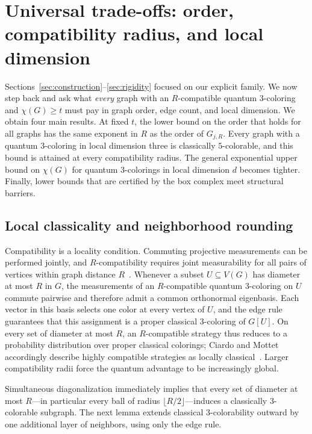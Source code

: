 \section{Universal trade-offs: order, compatibility radius, and local dimension}\label{sec:universal}

Sections~\ref{sec:construction}--\ref{sec:rigidity} focused on our explicit family. We now step back and ask what \emph{every} graph with an $R$-compatible quantum $3$-coloring and $\chi(G)\ge t$ must pay in graph order, edge count, and local dimension. We obtain four main results. At fixed $t$, the lower bound on the order that holds for all graphs has the same exponent in $R$ as the order of $G_{j,R}$. Every graph with a quantum $3$-coloring in local dimension three is classically $5$-colorable, and this bound is attained at every compatibility radius. The general exponential upper bound on $\chi(G)$ for quantum $3$-colorings in local dimension $d$ becomes tighter. Finally, lower bounds that are certified by the box complex meet structural barriers.

\subsection{Local classicality and neighborhood rounding}\label{sec:compatibility}

Compatibility is a locality condition. Commuting projective measurements can be performed jointly, and $R$-compatibility requires joint measurability for all pairs of vertices within graph distance $R$~\cite[Section~2.1]{C26}. Whenever a subset $U\subseteq V(G)$ has diameter at most $R$ in $G$, the measurements of an $R$-compatible quantum $3$-coloring on $U$ commute pairwise and therefore admit a common orthonormal eigenbasis. Each vector in this basis selects one color at every vertex of $U$, and the edge rule guarantees that this assignment is a proper classical $3$-coloring of $G[U]$. On every set of diameter at most $R$, an $R$-compatible strategy thus reduces to a probability distribution over proper classical colorings; Ciardo and Mottet accordingly describe highly compatible strategies as locally classical~\cite[Section~3]{CM}. Larger compatibility radii force the quantum advantage to be increasingly global.

Simultaneous diagonalization immediately implies that every set of diameter at most $R$---in particular every ball of radius $\lfloor R/2\rfloor$---induces a classically $3$-colorable subgraph. The next lemma extends classical $3$-colorability outward by one additional layer of neighbors, using only the edge rule.

